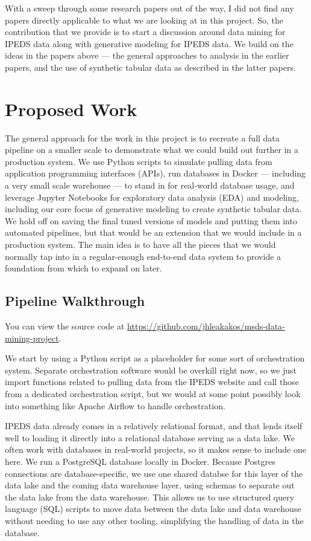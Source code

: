 \documentclass[sigconf, authorversion, nonacm]{acmart}
\begin{document}
    With a sweep through some research papers out of the way, I did not find any papers directly applicable to what we are looking at in this project. So, the contribution that we provide is to start a discussion around data mining for IPEDS data along with generative modeling for IPEDS data. We build on the ideas in the papers above --- the general approaches to analysis in the earlier papers, and the use of synthetic tabular data as described in the latter papers.

\section{Proposed Work}

    The general approach for the work in this project is to recreate a full data pipeline on a smaller scale to demonstrate what we could build out further in a production system. We use Python scripts to simulate pulling data from application programming interfaces (APIs), run databases in Docker --- including a very small scale warehouse --- to stand in for real-world database usage, and leverage Jupyter Notebooks for exploratory data analysis (EDA) and modeling, including our core focus of generative modeling to create synthetic tabular data. We hold off on saving the final tuned versions of models and putting them into automated pipelines, but that would be an extension that we would include in a production system. The main idea is to have all the pieces that we would normally tap into in a regular-enough end-to-end data system to provide a foundation from which to expand on later.

    \subsection{Pipeline Walkthrough}
        You can view the source code at \href{https://github.com/jhleakakos/msds-data-mining-project}{https://github.com/jhleakakos/msds-data-mining-project}.

        We start by using a Python script as a placeholder for some sort of orchestration system. Separate orchestration software would be overkill right now, so we just import functions related to pulling data from the IPEDS website and call those from a dedicated orchestration script, but we would at some point possibly look into something like Apache Airflow to handle orchestration.

        IPEDS data already comes in a relatively relational format, and that lends itself well to loading it directly into a relational database serving as a data lake. We often work with databases in real-world projects, so it makes sense to include one here. We run a PostgreSQL database locally in Docker. Because Postgres connections are database-specific, we use one shared databse for this layer of the data lake and the coming data warehouse layer, using schemas to separate out the data lake from the data warehouse. This allows us to use structured query language (SQL) scripts to move data between the data lake and data warehouse without needing to use any other tooling, simplifying the handling of data in the database.
\end{document}
